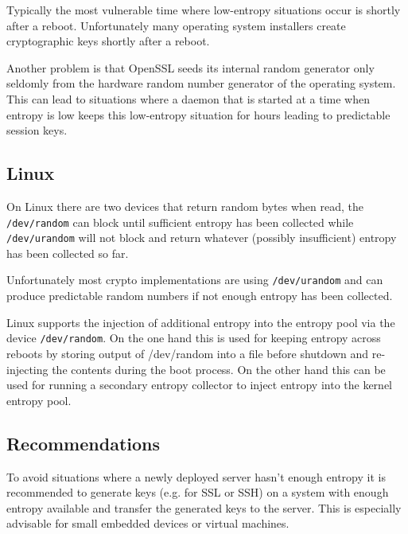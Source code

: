 Typically the most vulnerable time where low-entropy situations occur is
shortly after a reboot. Unfortunately many operating system installers
create cryptographic keys shortly after a reboot\cite{HDWH12}.

Another problem is that OpenSSL seeds its internal random generator only
seldomly from the hardware random number generator of the operating
system. This can lead to situations where a daemon that is started at a
time when entropy is low keeps this low-entropy situation for hours
leading to predictable session keys\cite{HDWH12}.

\subsection{Linux}

On Linux there are two devices that return random bytes when read, the
\verb+/dev/random+ can block until sufficient entropy has been collected
while \verb+/dev/urandom+ will not block and return whatever (possibly
insufficient) entropy has been collected so far.

Unfortunately most crypto implementations are using \verb+/dev/urandom+
and can produce predictable random numbers if not enough entropy has
been collected\cite{HDWH12}.

Linux supports the injection of additional entropy into the entropy pool
via the device \verb+/dev/random+. On the one hand this is used for
keeping entropy across reboots by storing output of /dev/random into a
file before shutdown and re-injecting the contents during the boot
process. On the other hand this can be used for running a secondary
entropy collector to inject entropy into the kernel entropy pool.



\subsection{Recommendations}

To avoid situations where a newly deployed server hasn't enough
entropy it is recommended to generate keys (e.g. for SSL or SSH) on
a system with enough entropy available and transfer the generated keys
to the server.  This is especially advisable for small embedded devices
or virtual machines.

